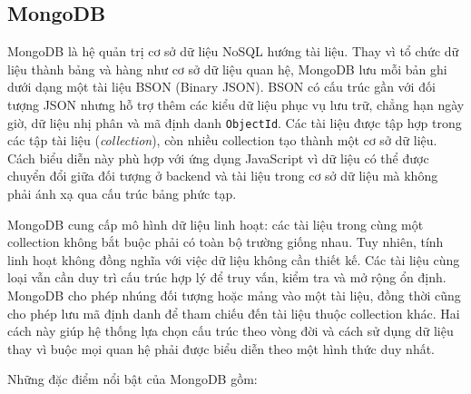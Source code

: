 \subsection{MongoDB}

MongoDB là hệ quản trị cơ sở dữ liệu NoSQL hướng tài liệu. Thay vì tổ chức dữ liệu thành bảng và hàng như cơ sở dữ liệu quan hệ, MongoDB lưu mỗi bản ghi dưới dạng một tài liệu BSON (Binary JSON). BSON có cấu trúc gần với đối tượng JSON nhưng hỗ trợ thêm các kiểu dữ liệu phục vụ lưu trữ, chẳng hạn ngày giờ, dữ liệu nhị phân và mã định danh \texttt{ObjectId}. Các tài liệu được tập hợp trong các tập tài liệu (\textit{collection}), còn nhiều collection tạo thành một cơ sở dữ liệu. Cách biểu diễn này phù hợp với ứng dụng JavaScript vì dữ liệu có thể được chuyển đổi giữa đối tượng ở backend và tài liệu trong cơ sở dữ liệu mà không phải ánh xạ qua cấu trúc bảng phức tạp.

MongoDB cung cấp mô hình dữ liệu linh hoạt: các tài liệu trong cùng một collection không bắt buộc phải có toàn bộ trường giống nhau. Tuy nhiên, tính linh hoạt không đồng nghĩa với việc dữ liệu không cần thiết kế. Các tài liệu cùng loại vẫn cần duy trì cấu trúc hợp lý để truy vấn, kiểm tra và mở rộng ổn định. MongoDB cho phép nhúng đối tượng hoặc mảng vào một tài liệu, đồng thời cũng cho phép lưu mã định danh để tham chiếu đến tài liệu thuộc collection khác. Hai cách này giúp hệ thống lựa chọn cấu trúc theo vòng đời và cách sử dụng dữ liệu thay vì buộc mọi quan hệ phải được biểu diễn theo một hình thức duy nhất.

Những đặc điểm nổi bật của MongoDB gồm:

